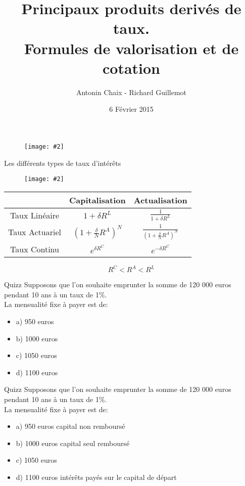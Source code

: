 \documentclass{beamer}
\title[Pdts dérivés de taux]{Principaux produits derivés de taux. \\ Formules de valorisation et de cotation}
\author{Antonin Chaix - Richard Guillemot}
\institute{Master IFMA}
\date{6 Février 2015}
\newcommand{\FIG}[2]{\texttt{[image: \#2]}}
\begin{document}
\begin{frame}
\titlepage
\begin{figure}[h]
\centering \FIG{5cm}{figures/UPMC_IFMA.jpg}
\end{figure}
\end{frame}

\begin{frame}{Les différents types de taux d'intérêts}
\begin{figure}[h]
\centering \FIG{7cm}{figures/capi_actu.png}
\end{figure}
\begin{center}
\begin{tabular}{|c|c|c|}
\hline
&\textbf{C}apitalisation&\textbf{A}ctualisation \\
\hline
  Taux Linéaire & $1+\delta R^L$ &  $\frac{1}{1+\delta R^L}$ \\
  Taux Actuariel & $(1+\frac{\delta}{N}R^A)^N$ &  $\frac{1}{(1+\frac{\delta}{N}R^A)^N}$ \\
  Taux Continu & $e^{\delta R^C}$ & $e^{-\delta R^C}$ \\
\hline
\end{tabular}
\end{center}
\[
	R^C < R^A < R^L
\]
\end{frame}

\begin{frame}{Quizz}
Supposons que l'on souhaite emprunter la somme de 120 000 euros pendant 10 ans à un taux de 1\%.\\

\vspace{0.5cm}
La mensualité fixe à payer est de:
\begin{itemize}
\item a) 950 euros
\item b) 1000 euros
\item c) 1050 euros
\item d) 1100 euros
\end{itemize}

\end{frame}

\begin{frame}{Quizz}
Supposons que l'on souhaite emprunter la somme de 120 000 euros pendant 10 ans à un taux de 1\%.\\

\vspace{0.5cm}
La mensualité fixe à payer est de:
\begin{itemize}
\item a) 950 euros \textbf{\color{red}{FAUX}} capital non remboursé
\item b) 1000 euros \textbf{\color{red}{FAUX}} capital seul remboursé
\item c) 1050 euros \textbf{\color{green}{VRAI}}
\item d) 1100 euros \textbf{\color{red}{VRAI}} intérêts payés sur le capital de départ
\end{itemize}

\end{frame}
\end{document}
